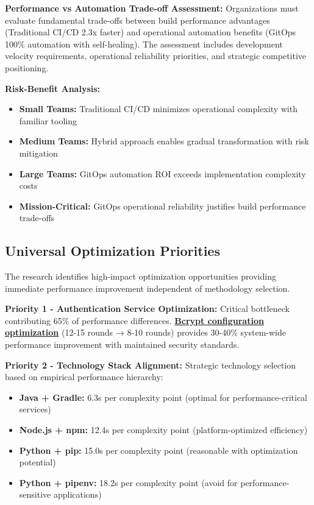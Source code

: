 \textbf{Performance vs Automation Trade-off Assessment:}
Organizations must evaluate fundamental trade-offs between build performance advantages (Traditional CI/CD 2.3x faster) and operational automation benefits (GitOps 100\% automation with self-healing). The assessment includes development velocity requirements, operational reliability priorities, and strategic competitive positioning.

\textbf{Risk-Benefit Analysis:}
\begin{itemize}
\item \textbf{Small Teams:} Traditional CI/CD minimizes operational complexity with familiar tooling
\item \textbf{Medium Teams:} Hybrid approach enables gradual transformation with risk mitigation
\item \textbf{Large Teams:} GitOps automation ROI exceeds implementation complexity costs
\item \textbf{Mission-Critical:} GitOps operational reliability justifies build performance trade-offs
\end{itemize}

\subsection{Universal Optimization Priorities}
\label{subsec:optimization_priorities}

The research identifies high-impact optimization opportunities providing immediate performance improvement independent of methodology selection.

\textbf{Priority 1 - Authentication Service Optimization:}
Critical bottleneck contributing 65\% of performance differences. \textbf{\hyperref[bcrypt_performance]{Bcrypt configuration optimization}} (12-15 rounds → 8-10 rounds) provides 30-40\% system-wide performance improvement with maintained security standards.

\textbf{Priority 2 - Technology Stack Alignment:}
Strategic technology selection based on empirical performance hierarchy:
\begin{itemize}
\item \textbf{Java + Gradle:} 6.3s per complexity point (optimal for performance-critical services)
\item \textbf{Node.js + npm:} 12.4s per complexity point (platform-optimized efficiency)
\item \textbf{Python + pip:} 15.0s per complexity point (reasonable with optimization potential)
\item \textbf{Python + pipenv:} 18.2s per complexity point (avoid for performance-sensitive applications)
\end{itemize}

